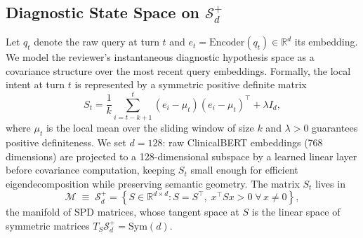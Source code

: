 \documentclass[11pt]{article}
\begin{document}
\subsection{Diagnostic State Space on $\mathcal{S}_d^+$}
\label{sec:statespace}

Let $q_t$ denote the raw query at turn $t$ and $e_t = \mathrm{Encoder}(q_t)\in\mathbb{R}^d$ its embedding. We model the reviewer's instantaneous diagnostic hypothesis space as a covariance structure over the most recent query embeddings. Formally, the local intent at turn $t$ is represented by a symmetric positive definite matrix
\begin{equation}
S_t = \frac{1}{k}\sum_{i=t-k+1}^{t}(e_i-\mu_t)(e_i-\mu_t)^{\top} + \lambda I_d,
\label{eq:spdintent}
\end{equation}
where $\mu_t$ is the local mean over the sliding window of size $k$ and $\lambda>0$ guarantees positive definiteness. We set $d=128$: raw ClinicalBERT embeddings (768 dimensions) \citep{alsentzer2019} are projected to a 128-dimensional subspace by a learned linear layer before covariance computation, keeping $S_t$ small enough for efficient eigendecomposition while preserving semantic geometry. The matrix $S_t$ lives in
\begin{equation}
\mathcal{M} \;\equiv\; \mathcal{S}_d^+ = \left\{ S\in\mathbb{R}^{d\times d} : S = S^{\top},\; x^{\top} S x > 0 \;\forall\, x\neq 0 \right\},
\label{eq:manifold}
\end{equation}
the manifold of SPD matrices, whose tangent space at $S$ is the linear space of symmetric matrices $T_S\mathcal{S}_d^+ = \mathrm{Sym}(d)$.
\end{document}
